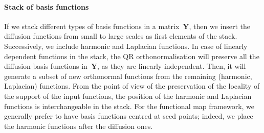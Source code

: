 \documentclass[acmtog,authorversion]{acmart}
\begin{document}
\paragraph*{Stack of basis functions}
If we stack different types of basis functions in a matrix~$\mathbf{Y}$, then we insert the diffusion functions from small to large scales as first elements of the stack. Successively, we include harmonic and Laplacian functions. In case of linearly dependent functions in the stack, the QR orthonormalisation will preserve all the diffusion basis functions in~$\mathbf{Y}$, as they are linearly independent. Then, it will generate a subset of new orthonormal functions from the remaining (harmonic, Laplacian) functions. From the point of view of the preservation of the locality of the support of the input functions, the position of the harmonic and Laplacian functions is interchangeable in the stack. For the functional map framework, we generally prefer to have basis functions centred at seed points; indeed, we place the harmonic functions after the diffusion ones. 
%
\end{document}

